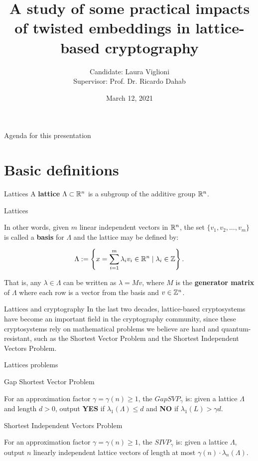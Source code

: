 \documentclass[notheorems, bigger]{beamer}
\author{Candidate: Laura Viglioni \\ Supervisor: Prof. Dr. Ricardo Dahab}
\date{March 12, 2021}
\title{A study of some practical impacts of twisted embeddings in lattice-based cryptography}
\begin{document}
\maketitle
\begin{frame}{Agenda for this presentation}
\tableofcontents
\end{frame}

\section{Basic definitions}
\label{sec:org563ff82}
\begin{frame}[label={sec:org3f73e7b}]{Lattices}
A \textbf{lattice} \(\Lambda \subset \mathbb{R}^n\) is a subgroup of the additive group \(\mathbb{R}^n\).
\end{frame}
\begin{frame}[label={sec:org9381103}]{Lattices}
\begin{text}
  In other words, given $m$ linear independent vectors in $\mathbb{R}^n$, the set
  $\{v_1, v_2, ..., v_m\}$ is called a \textbf{basis} for $\Lambda$ and the lattice may be defined
  by:

  \begin{equation*}
    \Lambda := \left\{x = \sum_{i=1}^m{\lambda_iv_i} \in \mathbb{R}^n \; | \; \lambda_i \in \mathbb{Z}\right\}.
  \end{equation*}

  That is, any $\lambda \in \Lambda$ can be written as $\lambda = Mv$, where $M$ is the
  \textbf{generator matrix} of $\Lambda$ where each row is a vector from the basis and
  $v \in \mathbb{Z}^n$.
\end{text}
\end{frame}
\begin{frame}[label={sec:org10d770e}]{Lattices and cryptography}
In the last two decades, lattice-based cryptosystems have become an important field in the cryptography community, since these cryptosystems rely on mathematical problems we believe are hard and quantum-resistant, such as the Shortest Vector Problem and the Shortest Independent Vectors Problem.
\end{frame}
\begin{frame}[label={sec:orgee35354}]{Lattices problems}
\begin{block}{Gap Shortest Vector Problem}
\begin{text}
  For an approximation factor $\gamma  = \gamma(n) \geq 1$, the $GapSVP_\gamma $ is: given a lattice
  $\Lambda$ and length $d > 0$, output \textbf{YES} if $\lambda_1(\Lambda) \leq d$ and \textbf{NO} if
  $\lambda_1(L) > \gamma d$. 
\end{text}
\end{block}
\begin{block}{Shortest Independent Vectors Problem}
\begin{text}
  For an approximation factor $\gamma = \gamma(n) \geq 1$, the $SIVP_\gamma$ is: given a lattice $\Lambda$, output $n$ linearly independent lattice vectors of length at most $\gamma(n) \cdot \lambda_n(\Lambda)$.
\end{text}
\end{block}
\end{frame}
\end{document}
